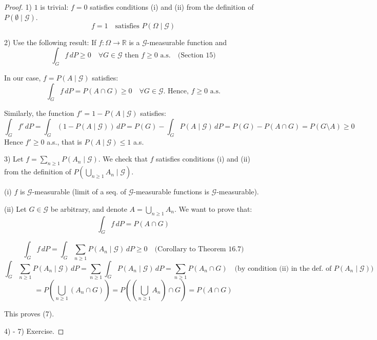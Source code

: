 \begin{proof}
1) \(1\) is trivial: \(f = 0\) satisfies conditions (i) and (ii) from the definition of \(P(\emptyset \mid \mathcal{G})\).
\[
f = 1 \quad \text{satisfies } P(\Omega \mid \mathcal{G})
\]

2) Use the following result: If \(f: \Omega \rightarrow \mathbb{R}\) is a \(\mathcal{G}\)-measurable function and
\[
\int_G f \, dP \geq 0 \quad \forall G \in \mathcal{G} \text{ then } f \geq 0 \text{ a.s.} \quad \text{(Section 15)}
\]

In our case, \(f = P(A \mid \mathcal{G})\) satisfies:
\[
\int_G f \, dP = P(A \cap G) \geq 0 \quad \forall G \in \mathcal{G}. \text{ Hence, } f \geq 0 \text{ a.s.}
\]

Similarly, the function \(f' = 1 - P(A \mid \mathcal{G})\) satisfies:
\[
\int_G f' \, dP = \int_G (1 - P(A \mid \mathcal{G})) \, dP = P(G) - \int_G P(A \mid \mathcal{G}) \, dP = P(G) - P(A \cap G) = P(G \setminus A) \geq 0
\]
Hence \(f' \geq 0\) a.s., that is \(P(A \mid \mathcal{G}) \leq 1\) a.s.

3) Let \(f = \sum_{n \geq 1} P(A_n \mid \mathcal{G})\). We check that \(f\) satisfies conditions (i) and (ii) from the definition of \(P(\bigcup_{n \geq 1} A_n \mid \mathcal{G})\).

(i) \(f\) is \(\mathcal{G}\)-measurable (limit of a seq. of \(\mathcal{G}\)-measurable functions is \(\mathcal{G}\)-measurable).

(ii) Let \(G \in \mathcal{G}\) be arbitrary, and denote \(A = \bigcup_{n \geq 1} A_n\). We want to prove that:
\[
\int_G f \, dP = P(A \cap G) \tag{7}
\]

\[
\int_G f \, dP = \int_G \sum_{n \geq 1} P(A_n \mid \mathcal{G}) \, dP \geq 0 \quad \text{(Corollary to Theorem 16.7)}
\]
\[
\int_G \sum_{n \geq 1} P(A_n \mid \mathcal{G}) \, dP = \sum_{n \geq 1} \int_G P(A_n \mid \mathcal{G}) \, dP = \sum_{n \geq 1} P(A_n \cap G) \quad \text{(by condition (ii) in the def. of } P(A_n \mid \mathcal{G}))
\]
\[
= P\left(\bigcup_{n \geq 1} (A_n \cap G)\right) = P\left(\left(\bigcup_{n \geq 1} A_n\right) \cap G\right) = P(A \cap G)
\]

This proves (7).

4) - 7) Exercise.

\end{proof}